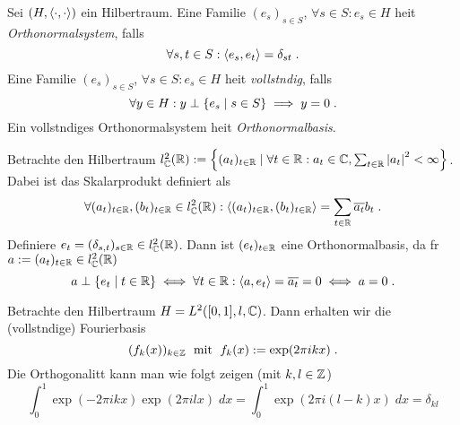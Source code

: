 \begin{definition}
	Sei \((H, \left\langle\cdot, \cdot\right\rangle)\) ein Hilbertraum. Eine Familie \((e_s)_{s\in S}\), \(\forall s \in S: e_s \in H\) hei\s t \textit{Orthonormalsystem}, falls
	\[\forall s, t \in S: \left\langle e_s, e_t\right\rangle = \delta_{st}\;.\]
	Eine Familie \((e_s)_{s\in S}\), \(\forall s \in S: e_s \in H\) hei\s t \textit{vollst\as ndig}, falls 
	\[\forall y \in H: y \perp \left\{e_s \;\vert\; s \in S\right\} \implies y = 0\;.\]
	Ein vollst\as ndiges Orthonormalsystem hei\s t \textit{Orthonormalbasis}.
\end{definition}

\begin{ex}
	Betrachte den Hilbertraum \(l^2_{\mathbb{C}}(\mathbb{R}): = \left\{(a_t)_{t\in\mathbb{R}} \;\vert\; \forall t\in \mathbb{R}: a_t \in \mathbb{C}, \sum_{t\in \mathbb{R}} \left\lvert a_t \right\rvert^2 < \infty\right\}\). Dabei ist das Skalarprodukt definiert als
	\[\forall (a_t)_{t\in\mathbb{R}}, (b_t)_{t\in\mathbb{R}} \in l^2_{\mathbb{C}}(\mathbb{R}): \left\langle(a_t)_{t\in\mathbb{R}},(b_t)_{t\in\mathbb{R}}\right\rangle = \sum_{t\in\mathbb{R}} \overline{a_t} b_t\;.\]
	Definiere \(e_t = (\delta_{s,t})_{s\in\mathbb{R}}\in l^2_{\mathbb{C}}(\mathbb{R})\). Dann ist \((e_t)_{t\in\mathbb{R}}\) eine Orthonormalbasis, da f\us r \(a:=(a_t)_{t\in\mathbb{R}} \in l^2_{\mathbb{C}}(\mathbb{R})\)
	\[a \perp \left\{e_t\;\vert\;t\in\mathbb{R}\right\} \iff \forall t \in \mathbb{R}: \left\langle a,e_t\right\rangle = \overline{a_t} = 0 \iff a = 0\;.\]
\end{ex}

\begin{ex}
	Betrachte den Hilbertraum \(H = L^2([0,1], l, \mathbb{C})\). Dann erhalten wir die (vollst\as ndige) Fourierbasis
	\[(f_k(x))_{k\in\mathbb{Z}} \;\text{ mit }\; f_k(x) := \exp(2\pi i kx) \;.\]
	Die Orthogonalit\as t kann man wie folgt zeigen (mit \(k, l \in \mathbb{Z}\))
	\[\int_0^1 \exp(-2\pi i  k x)\exp(2\pi i l x)\;dx = \int_0^1 \exp(2\pi i (l-k)x) \;dx = \delta_{kl}\]
\end{ex}

